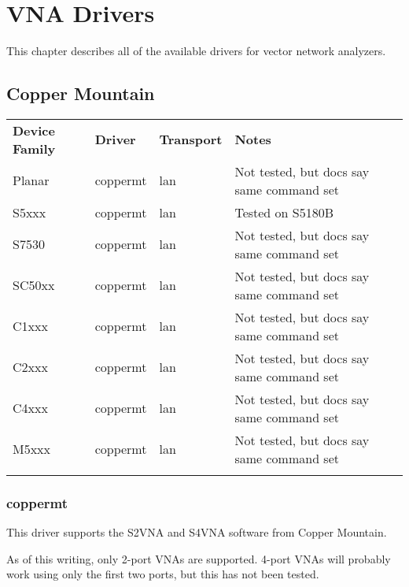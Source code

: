 \chapter{VNA Drivers}
\label{sec:load-drivers}

This chapter describes all of the available drivers for vector network analyzers.

\section{Copper Mountain}

\begin{tabularx}{16cm}{lllX}
\thickhline
\textbf{Device Family} & \textbf{Driver} & \textbf{Transport} & \textbf{Notes} \\
\thickhline
Planar & coppermt & lan & Not tested, but docs say same command set \\
S5xxx  & coppermt & lan & Tested on S5180B \\
S7530 & coppermt & lan & Not tested, but docs say same command set \\
SC50xx & coppermt & lan & Not tested, but docs say same command set \\
C1xxx & coppermt & lan & Not tested, but docs say same command set \\
C2xxx & coppermt & lan & Not tested, but docs say same command set \\
C4xxx & coppermt & lan & Not tested, but docs say same command set \\
M5xxx & coppermt & lan & Not tested, but docs say same command set \\
\thickhline
\end{tabularx}

\subsection{coppermt}

This driver supports the S2VNA and S4VNA software from Copper Mountain.

As of this writing, only 2-port VNAs are supported. 4-port VNAs will probably work using only the first two ports,
but this has not been tested.

